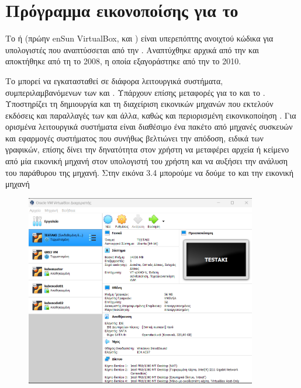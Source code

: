 \section{Πρόγραμμα εικονοποίσης για το }

Το  ή  (πρώην en{Sun VirtualBox},  και ) είναι υπερεπόπτης
ανοιχτού κώδικα για υπολογιστές  που αναπτύσσεται από την .
Αναπτύχθηκε αρχικά από την 
και αποκτήθηκε από τη  το 2008, η οποία εξαγοράστηκε από την  το 2010.

Το  μπορεί να εγκατασταθεί σε διάφορα λειτουργικά συστήματα, συμπεριλαμβανόμενων των  και .
Υπάρχουν επίσης μεταφορές για το  και το .
Υποστηρίζει τη δημιουργία και τη διαχείριση εικονικών μηχανών που εκτελούν εκδόσεις και παραλλαγές των 
και άλλα, καθώς και περιορισμένη εικονικοποίηση .
Για ορισμένα λειτουργικά συστήματα είναι διαθέσιμο ένα πακέτο  από μηχανές συσκευών και εφαρμογές συστήματος
που συνήθως βελτιώνει την απόδοση, ειδικά των γραφικών, επίσης δίνει την δηνατότητα στον χρήστη να μεταφέρει αρχεία ή κείμενο από μία εικονική μηχανή στον υπολογιστή του χρήστη και να αυξήσει την ανάλυση του παράθυρου της μηχανή. 
Στην εικόνα 3.4 μπορούμε να δούμε το  και την εικονική μηχανή 

\begin{figure}[htb]
	\centering
	\includegraphics[width=0.9\textwidth]{graphics/virtualbox.PNG}
	\caption{ }
\end{figure}


